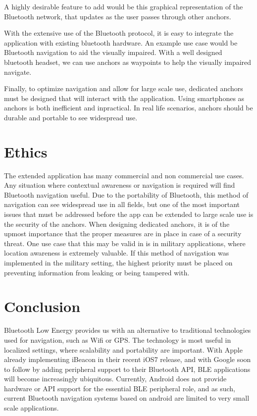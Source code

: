 \documentclass{sig-alternate}
\begin{document}
A highly desirable feature to add would be this graphical 
representation of the Bluetooth network, that updates as
the user passes through other anchors. 

With the extensive use of the Bluetooth protocol, it is easy to
integrate the application with existing bluetooth hardware.
An example use case would be Bluetooth navigation to 
aid the visually impaired. With a well designed bluetooth
headset, we can use anchors as waypoints to help
the visually impaired navigate.

Finally, to optimize navigation and allow for large scale
use, dedicated anchors must be designed that will interact
with the application. Using smartphones as anchors is both
inefficient and inpractical. In real life scenarios, anchors
should be durable and portable to see widespread use.

\section{Ethics}
\label{sec:ethics}
The extended application has many commercial and 
non commercial use cases. Any situation where contextual
awareness or navigation is required will find Bluetooth
navigation useful. Due to the portability of Bluetooth, this
method of navigation can see widespread use in all fields, 
but one of the most important issues that must be addressed
before the app can be extended to large scale use is the 
security of the anchors. When designing dedicated anchors,
it is of the upmost importance that the proper measures are
in place in case of a security threat. One use case that
this may be valid in is in military applications, where location
awareness is extremely valuable. If this method of navigation
was implemented in the military setting, the highest 
priority must be placed on preventing information from
leaking or being tampered with.

\section{Conclusion}
\label{sec:conclusion}
Bluetooth Low Energy provides us with an alternative to
traditional technologies used for navigation, such as Wifi or GPS. 
The technology is most useful in localized settings, 
where scalability and portability are important. With Apple
already implementing iBeacon in their recent iOS7 release,
and with Google soon to follow by adding peripheral support
to their Bluetooth API, BLE applications will become 
increasingly ubiquitous. Currently, Android does not provide
hardware or API support for the essential BLE peripheral
role, and as such, current Bluetooth navigation systems 
based on android are limited to very small scale applications. 
\end{document}
